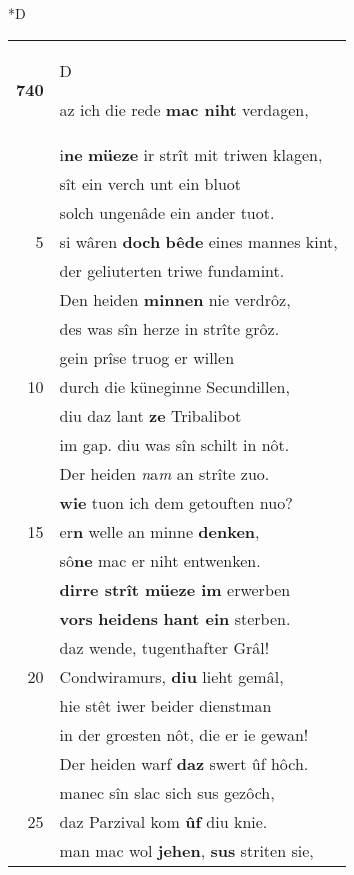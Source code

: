 \documentclass[8pt,a4paper,notitlepage]{article}
\begin{document}
\begin{table}[ht]
\begin{minipage}[t]{0.5\linewidth}
\small
\begin{center}*D
\end{center}
\begin{tabular}{rl}
\textbf{740} & \begin{large}D\end{large}az ich die rede \textbf{mac niht} verdagen,\\ 
 & i\textbf{ne} \textbf{müeze} ir strît mit triwen klagen,\\ 
 & sît ein verch unt ein bluot\\ 
 & solch ungenâde ein ander tuot.\\ 
5 & si wâren \textbf{doch} \textbf{bêde} eines mannes kint,\\ 
 & der geliuterten triwe fundamint.\\ 
 & Den heiden \textbf{minnen} nie verdrôz,\\ 
 & des was sîn herze in strîte grôz.\\ 
 & gein prîse truog er willen\\ 
10 & durch die küneginne Secundillen,\\ 
 & diu daz lant \textbf{ze} Tribalibot\\ 
 & im gap. diu was sîn schilt in nôt.\\ 
 & Der heiden \textit{n}a\textit{m} an strîte zuo.\\ 
 & \textbf{wie} tuon ich dem getouften nuo?\\ 
15 & er\textbf{n} welle an minne \textbf{denken},\\ 
 & sô\textbf{ne} mac er niht entwenken.\\ 
 & \textbf{dirre strît müeze im} erwerben\\ 
 & \textbf{vor}\textbf{s} \textbf{heidens} \textbf{hant ein} sterben.\\ 
 & daz wende, tugenthafter Grâl!\\ 
20 & Condwiramurs, \textbf{diu} lieht gemâl,\\ 
 & hie stêt iwer beider dienstman\\ 
 & in der grœsten nôt, die er ie gewan!\\ 
 & Der heiden warf \textbf{daz} swert ûf hôch.\\ 
 & manec sîn slac sich sus gezôch,\\ 
25 & daz Parzival kom \textbf{ûf} diu knie.\\ 
 & man mac wol \textbf{jehen}, \textbf{sus} striten sie,\\ 

\end{tabular}
\end{minipage}
\end{table}
\end{document}

